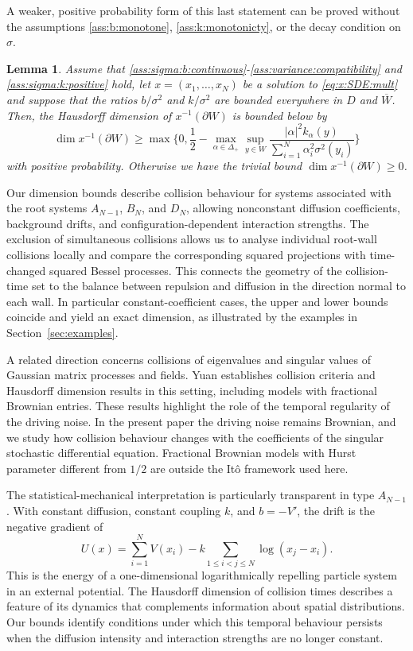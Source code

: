 \documentclass{article}
\numberwithin{equation}{section}
\newcommand{\Cc}{\overline{W}}
\newcommand{\Sni}{\sum_{i=1}^N}
\newcommand{\domain}{D}
\theoremstyle{plain}
\newtheorem{lemma}[theorem]{Lemma}
\begin{document}
A weaker, positive probability form of this last statement can be proved without the assumptions \ref{ass:b:monotone}, \ref{ass:k:monotonicty}, or the decay condition on $\sigma$.
\begin{lemma}
    Assume that \ref{ass:sigma:b:continuous}-\ref{ass:variance:compatibility} and \ref{ass:sigma:k:positive} hold, let $x=(x_1,\dots,x_N)$ be a solution to \eqref{eq:x:SDE:mult} and suppose that the ratios $b/\sigma^2$ and $k/\sigma^2$ are bounded everywhere in $\domain$ and $\Cc$. Then, the Hausdorff dimension of $x^{-1}(\partial W)$ is bounded below by
        \[\dim x^{-1}(\partial W)\geq \max \bigg\{0,\frac12 - \max_{\alpha\in \Delta_+}\sup_{y\in W}\frac{|\alpha|^2k_\alpha(y)}{\Sni\alpha_i^2\sigma^2(y_i)}\bigg\}\]
        with positive probability. Otherwise we have the trivial bound $\dim x^{-1}(\partial W)\geq 0$.
    \label{th:Hausdorfflowerweak}
\end{lemma}
Our dimension bounds describe collision behaviour for systems associated with the root systems $A_{N-1}$, $B_N$, and $D_N$, allowing nonconstant diffusion coefficients, background drifts, and configuration-dependent interaction strengths. The exclusion of simultaneous collisions allows us to analyse individual root-wall collisions locally and compare the corresponding squared projections with time-changed squared Bessel processes. This connects the geometry of the collision-time set to the balance between repulsion and diffusion in the direction normal to each wall. In particular constant-coefficient cases, the upper and lower bounds coincide and yield an exact dimension, as illustrated by the examples in Section~\ref{sec:examples}.

A related direction concerns collisions of eigenvalues and singular values of Gaussian matrix processes and fields. Yuan \cite{Yuan24} establishes collision criteria and Hausdorff dimension results in this setting, including models with fractional Brownian entries. These results highlight the role of the temporal regularity of the driving noise. In the present paper the driving noise remains Brownian, and we study how collision behaviour changes with the coefficients of the singular stochastic differential equation. Fractional Brownian models with Hurst parameter different from $1/2$ are outside the It\^o framework used here.

The statistical-mechanical interpretation is particularly transparent in type $A_{N-1}$. With constant diffusion, constant coupling $k$, and $b=-V'$, the drift is the negative gradient of
    \begin{equation*}
        U(x)=\sum_{i=1}^N V(x_i) -k\sum_{1\leq i<j\leq N}\log(x_j-x_i).
    \end{equation*}
This is the energy of a one-dimensional logarithmically repelling particle system in an external potential. The Hausdorff dimension of collision times describes a feature of its dynamics that complements information about spatial distributions. Our bounds identify conditions under which this temporal behaviour persists when the diffusion intensity and interaction strengths are no longer constant.
\end{document}
